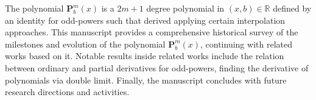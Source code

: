 The polynomial $\mathbf{P}^m_b(x)$ is a $2m+1$ degree polynomial in $(x,b) \in \mathbb{R}$
defined by an identity for odd-powers such that derived applying certain interpolation approaches.
This manuscript provides a comprehensive historical survey of the milestones and evolution of the polynomial
$\mathbf{P}^m_b(x)$, continuing with related works based on it.
Notable results inside related works include the relation between ordinary and partial derivatives for odd-powers,
finding the derivative of polynomials via double limit.
Finally, the manuscript concludes with future research directions and activities.
